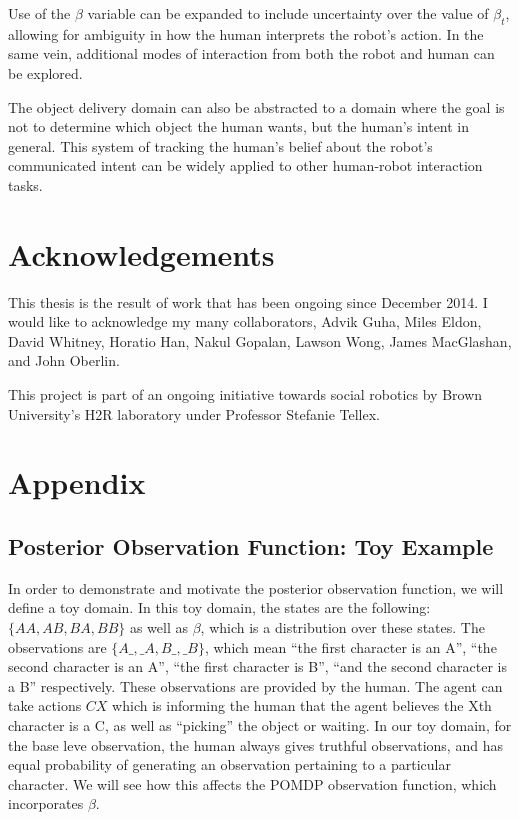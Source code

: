 \documentclass{article}
\begin{document}
\begin{multicols}{2}
Use of the $\beta$ variable can be expanded to include uncertainty over the value of $\beta_t$, allowing for ambiguity in how the human interprets the robot's action. In the same vein, additional modes of interaction from both the robot and human can be explored. 

The object delivery domain can also be abstracted to a domain where the goal is not to determine which object the human wants, but the human's intent in general. This system of tracking the human's belief about the robot's communicated intent can be widely applied to other human-robot interaction tasks. 

\section{Acknowledgements}

This thesis is the result of work that has been ongoing since December 2014. I would like to acknowledge my many collaborators, Advik Guha, Miles Eldon, David Whitney, Horatio Han, Nakul Gopalan, Lawson Wong, James MacGlashan, and John Oberlin. 

This project is part of an ongoing initiative towards social robotics by Brown University's H2R laboratory under Professor Stefanie Tellex. 

\end{multicols}

\newpage
\section{Appendix}

\subsection{Posterior Observation Function: Toy Example}
In order to demonstrate and motivate the posterior observation function, we will define a toy domain. In this toy domain, the states are the following: $\{AA, AB, BA, BB\}$ as well as $\beta$, which is a distribution over these states. The observations are $\{A\_, \_A, B\_, \_B\}$, which mean ``the first character is an A'', ``the second character is an A'', ``the first character is B'', ``and the second character is a B'' respectively. These observations are provided by the human. The agent can take actions $CX$ which is informing the human that the agent believes the Xth character is a C, as well as ``picking'' the object or waiting. In our toy domain, for the base leve observation, the human always gives truthful observations, and has equal probability of generating an observation pertaining to a particular character. We will see how this affects the POMDP observation function, which incorporates $\beta$. 
\end{document}
